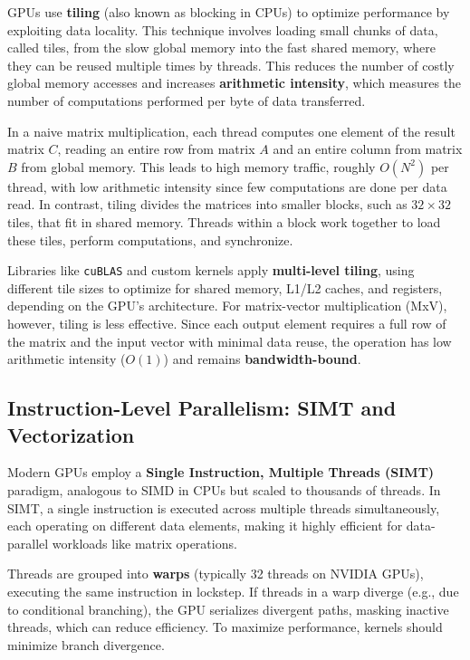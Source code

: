 GPUs use \textbf{tiling} (also known as blocking in CPUs) to optimize performance by exploiting data locality. This technique involves loading small chunks of data, called tiles, from the slow global memory into the fast shared memory, where they can be reused multiple times by threads. This reduces the number of costly global memory accesses and increases \textbf{arithmetic intensity}, which measures the number of computations performed per byte of data transferred.

In a naive matrix multiplication, each thread computes one element of the result matrix \( C \), reading an entire row from matrix \( A \) and an entire column from matrix \( B \) from global memory. This leads to high memory traffic, roughly \( O(N^2) \) per thread, with low arithmetic intensity since few computations are done per data read. In contrast, tiling divides the matrices into smaller blocks, such as \( 32 \times 32 \) tiles, that fit in shared memory. Threads within a block work together to load these tiles, perform computations, and synchronize.

Libraries like \texttt{cuBLAS} and custom kernels apply \textbf{multi-level tiling}, using different tile sizes to optimize for shared memory, L1/L2 caches, and registers, depending on the GPU's architecture. For matrix-vector multiplication (MxV), however, tiling is less effective. Since each output element requires a full row of the matrix and the input vector with minimal data reuse, the operation has low arithmetic intensity (\( O(1) \)) and remains \textbf{bandwidth-bound}.

\subsection{Instruction-Level Parallelism: SIMT and Vectorization}

Modern GPUs employ a \textbf{Single Instruction, Multiple Threads (SIMT)} paradigm, analogous to SIMD in CPUs but scaled to thousands of threads. In SIMT, a single instruction is executed across multiple threads simultaneously, each operating on different data elements, making it highly efficient for data-parallel workloads like matrix operations.

Threads are grouped into \textbf{warps} (typically 32 threads on NVIDIA GPUs), executing the same instruction in lockstep. If threads in a warp diverge (e.g., due to conditional branching), the GPU serializes divergent paths, masking inactive threads, which can reduce efficiency. To maximize performance, kernels should minimize branch divergence.

